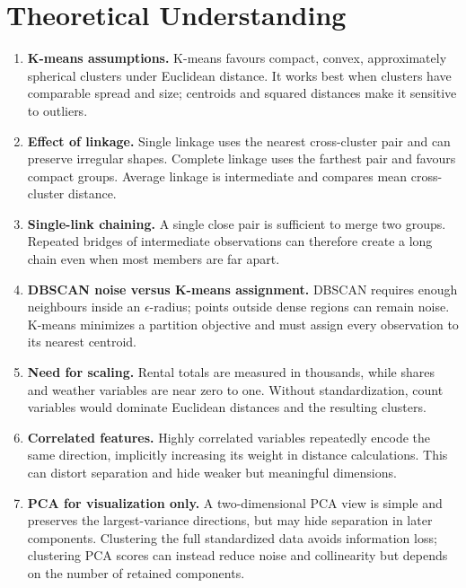 \documentclass[conference]{IEEEtran}
\begin{document}
\section{Theoretical Understanding}
\begin{enumerate}
\setlength{\itemsep}{1pt}
\setlength{\parskip}{0pt}
\item \textbf{K-means assumptions.} K-means favours compact, convex, approximately spherical clusters under Euclidean distance. It works best when clusters have comparable spread and size; centroids and squared distances make it sensitive to outliers.

\item \textbf{Effect of linkage.} Single linkage uses the nearest cross-cluster pair and can preserve irregular shapes. Complete linkage uses the farthest pair and favours compact groups. Average linkage is intermediate and compares mean cross-cluster distance.

\item \textbf{Single-link chaining.} A single close pair is sufficient to merge two groups. Repeated bridges of intermediate observations can therefore create a long chain even when most members are far apart.

\item \textbf{DBSCAN noise versus K-means assignment.} DBSCAN requires enough neighbours inside an \(\epsilon\)-radius; points outside dense regions can remain noise. K-means minimizes a partition objective and must assign every observation to its nearest centroid.

\item \textbf{Need for scaling.} Rental totals are measured in thousands, while shares and weather variables are near zero to one. Without standardization, count variables would dominate Euclidean distances and the resulting clusters.

\item \textbf{Correlated features.} Highly correlated variables repeatedly encode the same direction, implicitly increasing its weight in distance calculations. This can distort separation and hide weaker but meaningful dimensions.

\item \textbf{PCA for visualization only.} A two-dimensional PCA view is simple and preserves the largest-variance directions, but may hide separation in later components. Clustering the full standardized data avoids information loss; clustering PCA scores can instead reduce noise and collinearity but depends on the number of retained components.


\end{enumerate}
\end{document}

